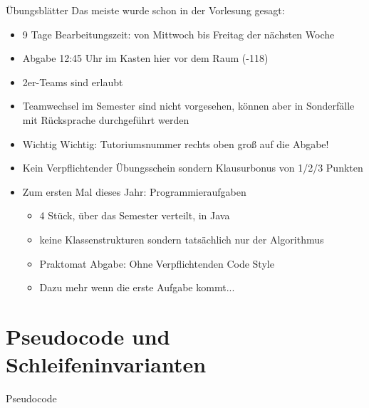 \documentclass[18pt]{beamer}
\begin{document}
	\begin{frame}{Übungsblätter}
		Das meiste wurde schon in der Vorlesung gesagt:
		\begin{itemize}
			\item 9 Tage Bearbeitungszeit: von Mittwoch bis Freitag der nächsten Woche
			\item Abgabe 12:45 Uhr im Kasten hier vor dem Raum (-118)
			\item 2er-Teams sind erlaubt
			\item Teamwechsel im Semester sind nicht vorgesehen, können aber in Sonderfälle mit Rücksprache durchgeführt werden
			\item Wichtig Wichtig: Tutoriumsnummer rechts oben groß auf die Abgabe!
			\item Kein Verpflichtender Übungsschein sondern Klausurbonus von 1/2/3 Punkten
			\item Zum ersten Mal dieses Jahr: Programmieraufgaben
			\begin{itemize}
				\item 4 Stück, über das Semester verteilt, in Java
				\item keine Klassenstrukturen sondern tatsächlich nur der Algorithmus
				\item Praktomat Abgabe: Ohne Verpflichtenden Code Style
				\item Dazu mehr wenn die erste Aufgabe kommt...
			\end{itemize}
		\end{itemize}		
	\end{frame}

\section{Pseudocode und Schleifeninvarianten}
	\begin{frame} {Pseudocode}
		
	\end{frame} 
\end{document}
